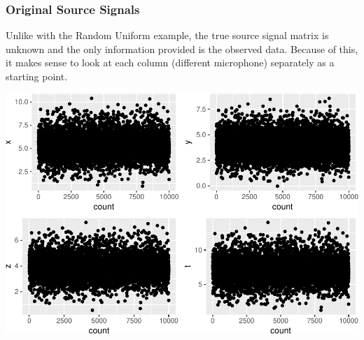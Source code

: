\documentclass[12pt,twoside]{amherstthesis}
\begin{document}
  \begin{Shaded}
  \begin{Highlighting}[]
  \NormalTok{(}\NormalTok{)}
  \StringTok{ }\NormalTok{CPPdata[}\NormalTok{(}\NormalTok{),]}
  \StringTok{ } \OperatorTok{:}
  \StringTok{ }\NormalTok{(}\NormalTok{,}\NormalTok{,}\NormalTok{,}\NormalTok{, }\NormalTok{) }
  \StringTok{ } \OperatorTok{:}
  \end{Highlighting}
  \end{Shaded}
  
  \subsubsection{Original Source Signals}\label{original-source-signals}
  
  Unlike with the Random Uniform example, the true source signal matrix is
  unknown and the only information provided is the observed data. Because
  of this, it makes sense to look at each column (different microphone)
  separately as a starting point.
  
  \begin{center}\includegraphics{ICAStatsComps_files/figure-latex/unnamed-chunk-7-1} \end{center}
  
\end{document}

